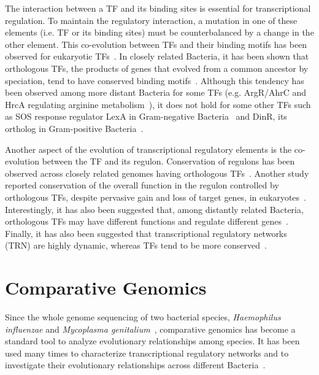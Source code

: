 The interaction between a TF and its binding sites is essential for transcriptional
regulation. To maintain the regulatory interaction, a mutation in one of these
elements (i.e. TF or its binding sites) must be counterbalanced by a change in
the other element. This co-evolution between TFs and their binding motifs has
been observed for eukaryotic TFs~\citep{yang2011correlated}. In closely related
Bacteria, it has been shown that orthologous TFs, the products of genes that
evolved from a common ancestor by speciation, tend to have conserved binding
motifs~\citep{makarova2001conservation}. Although this tendency has been
observed among more distant Bacteria for some TFs (e.g. ArgR/AhrC and HrcA
regulating arginine metabolism~\citep{maas1994arginine, klingel1995binding}), it
does not hold for some other TFs such as SOS response regulator LexA in
Gram-negative Bacteria~\citep{walker1985inducible} and DinR, its ortholog in
Gram-positive Bacteria~\citep{winterling1998bacillus}.

Another aspect of the evolution of transcriptional regulatory elements is the
co-evolution between the TF and its regulon. Conservation of regulons has been
observed across closely related genomes having orthologous
TFs~\citep{mironov1999computer, tan2001comparative}. Another study reported
conservation of the overall function in the regulon controlled by orthologous
TFs, despite pervasive gain and loss of target genes, in
eukaryotes~\citep{habib2012functional}. Interestingly, it has also been
suggested that, among distantly related Bacteria, orthologous TFs may have
different functions and regulate different
genes~\citep{price2007orthologous}. Finally, it has also been suggested that
transcriptional regulatory networks (TRN) are highly dynamic, whereas TFs tend to
be more conserved~\citep{babu2006evolutionary, chavez2006bacterial}.

\section{Comparative Genomics}

Since the whole genome sequencing of two bacterial species, \textit{Haemophilus
  influenzae} and \textit{Mycoplasma genitalium}~\citep{fleischmann1995whole,
  fraser1995minimal}, comparative genomics has become a standard tool to
analyze evolutionary relationships among species. It has been used many times
to characterize transcriptional regulatory networks and to investigate their
evolutionary relationships across different
Bacteria~\citep{gelfand2000prediction, ravcheev2013genomic,
  meireles2009comparative, kellis2004methods, erill2004differences,
  erill2007aeons, sanchez2012analysis, cornish2012inference}.

